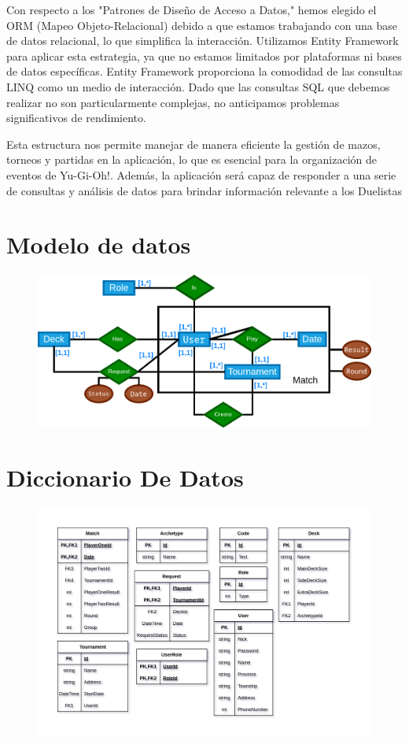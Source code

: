 \documentclass[a4paper]{article}
\begin{document}
Con respecto a los "Patrones de Diseño de Acceso a Datos," hemos elegido el ORM (Mapeo Objeto-Relacional) debido a que estamos trabajando con una base de datos relacional, lo que simplifica la interacción. Utilizamos Entity Framework para aplicar esta estrategia, ya que no estamos limitados por plataformas ni bases de datos específicas. Entity Framework proporciona la comodidad de las consultas LINQ como un medio de interacción. Dado que las consultas SQL que debemos realizar no son particularmente complejas, no anticipamos problemas significativos de rendimiento.

Esta estructura nos permite manejar de manera eficiente la gestión de mazos, torneos y partidas en la aplicación, lo que es esencial para la organización de eventos de Yu-Gi-Oh!. Además, la aplicación será capaz de responder a una serie de consultas y análisis de datos para brindar información relevante a los Duelistas
\newpage
\section{Modelo de datos}
	\begin{figure}[h]
  		\includegraphics[width=1\textwidth]{merx.png} 
	\end{figure}
\newpage
\section{Diccionario De Datos}
	\begin{figure}[h]
  		\includegraphics[width=1\textwidth]{dic.png} 
	\end{figure}
	
\end{document}
